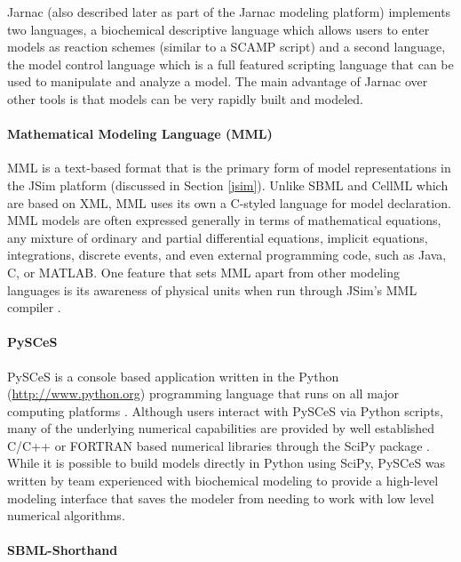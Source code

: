Jarnac \autocite{sauro:2000} \autocite{bergmann2006sbw} (also described
later as part of the Jarnac modeling platform) implements two languages,
a biochemical descriptive language which allows users to enter models as
reaction schemes (similar to a SCAMP script) and a second language, the
model control language which is a full featured scripting language that
can be used to manipulate and analyze a model. The main advantage of
Jarnac over other tools is that models can be very rapidly built and
modeled.

\paragraph{Mathematical Modeling Language (MML)}

MML is a text-based format that is the primary form of model
representations in the JSim platform \autocite{raymond03} (discussed in
Section \ref{jsim}). Unlike SBML and CellML which are based on XML, MML
uses its own a C-styled language for model declaration. MML models are
often expressed generally in terms of mathematical equations, any
mixture of ordinary and partial differential equations, implicit
equations, integrations, discrete events, and even external programming
code, such as Java, C, or MATLAB. One feature that sets MML apart from
other modeling languages is its awareness of physical units when run
through JSim's MML compiler \autocite{chizeck2009}.

\paragraph{PySCeS}

PySCeS is a console based application written in the Python
(\url{http://www.python.org}) programming language that runs on all
major computing platforms \autocite{Pysces2004}. Although users interact
with PySCeS via Python scripts, many of the underlying numerical
capabilities are provided by well established C/C++ or FORTRAN based
numerical libraries through the SciPy package
\autocite{olivier2002modelling}. While it is possible to build models
directly in Python using SciPy, PySCeS was written by team experienced
with biochemical modeling to provide a high-level modeling interface
that saves the modeler from needing to work with low level numerical
algorithms.

\paragraph{SBML-Shorthand}

